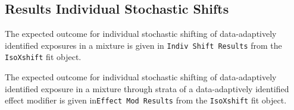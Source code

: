 \documentclass[
]{article}
\newenvironment{Shaded}{\begin{snugshade}}{\end{snugshade}}
\newcommand{\AttributeTok}[1]{\textcolor[rgb]{0.77,0.63,0.00}{#1}}
\newcommand{\FunctionTok}[1]{\textcolor[rgb]{0.00,0.00,0.00}{#1}}
\newcommand{\NormalTok}[1]{#1}
\newcommand{\OtherTok}[1]{\textcolor[rgb]{0.56,0.35,0.01}{#1}}
\newcommand{\SpecialCharTok}[1]{\textcolor[rgb]{0.00,0.00,0.00}{#1}}
\newcommand{\StringTok}[1]{\textcolor[rgb]{0.31,0.60,0.02}{#1}}
\begin{document}
\hypertarget{results-individual-stochastic-shifts}{%
\subsection{Results Individual Stochastic
Shifts}\label{results-individual-stochastic-shifts}}

The expected outcome for individual stochastic shifting of
data-adaptively identified exposures in a mixture is given in
\texttt{Indiv\ Shift\ Results} from the \texttt{IsoXshift} fit object.

\begin{Shaded}
\end{Shaded}

The expected outcome for individual stochastic shifting of
data-adaptively identified exposure in a mixture through strata of a
data-adaptively identified effect modifier is given
in\texttt{Effect\ Mod\ Results} from the \texttt{IsoXshift} fit object.

\begin{Shaded}
\end{Shaded}
\end{document}
